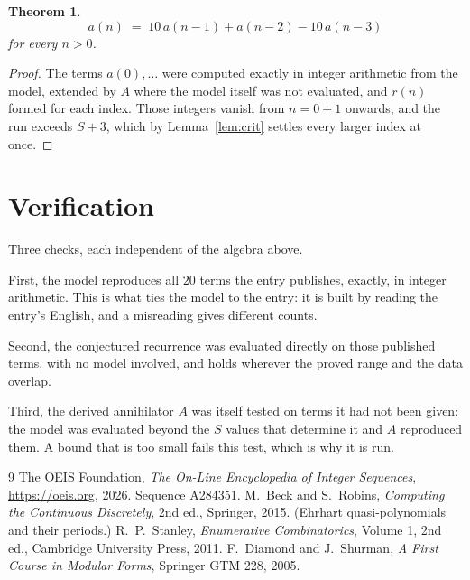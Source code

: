 \documentclass[11pt,a4paper]{article}
\theoremstyle{plain}
\newtheorem{theorem}{Theorem}
\theoremstyle{definition}
\begin{document}
\begin{theorem}
\[
a(n)\;=\;10\,a(n-1) + a(n-2) - 10\,a(n-3)
\]
for every $n>0$.
\end{theorem}

\begin{proof}
The terms $a(0),\dots$ were computed exactly in integer arithmetic from the model, extended by
$A$ where the model itself was not evaluated, and $r(n)$ formed for each index. Those integers
vanish from $n=0+1$ onwards, and the run exceeds $S+3$, which by
Lemma~\ref{lem:crit} settles every larger index at once.
\end{proof}

\section{Verification}

Three checks, each independent of the algebra above.

First, the model reproduces all $20$ terms the entry publishes, exactly, in integer
arithmetic. This is what ties the model to the entry: it is built by reading the entry's
English, and a misreading gives different counts.

Second, the conjectured recurrence was evaluated directly on those published terms, with no
model involved, and holds wherever the proved range and the data overlap.

Third, the derived annihilator $A$ was itself tested on terms it had not been given: the model
was evaluated beyond the $S$ values that determine it and $A$ reproduced them. A bound that is
too small fails this test, which is why it is run.

\begin{thebibliography}{9}
 The OEIS Foundation, \emph{The On-Line Encyclopedia of Integer
Sequences}, \url{https://oeis.org}, 2026. Sequence A284351.
 M.~Beck and S.~Robins, \emph{Computing the Continuous Discretely},
2nd ed., Springer, 2015. (Ehrhart quasi-polynomials and their periods.)
 R.~P.~Stanley, \emph{Enumerative Combinatorics}, Volume 1, 2nd ed.,
Cambridge University Press, 2011.
 F.~Diamond and J.~Shurman, \emph{A First Course in Modular Forms},
Springer GTM 228, 2005.
\end{thebibliography}
\end{document}
